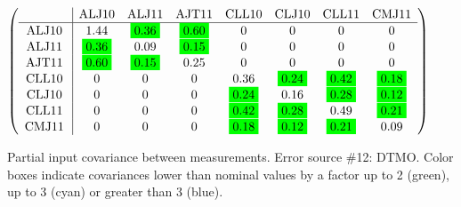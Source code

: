 \begin{table}[H]
\scriptsize
\begin{center}
\renewcommand{\arraystretch}{1.1}
\begin{math}\left(\begin{array}{c|ccccccc}
 & \mathrm{ALJ10} & 
\mathrm{ALJ11} & 
\mathrm{AJT11} & 
\mathrm{CLL10} & 
\mathrm{CLJ10} & 
\mathrm{CLL11} & 
\mathrm{CMJ11} \\
\hline
\mathrm{ALJ10} \hspace*{2pt} &       1.44 &  \colorbox{Green1}{$      0.36$} &  \colorbox{Green1}{$      0.60$} &  0 &  0 &  0 &  0 \\
\mathrm{ALJ11} \hspace*{2pt} &  \colorbox{Green1}{$      0.36$} &       0.09 &  \colorbox{Green1}{$      0.15$} &  0 &  0 &  0 &  0 \\
\mathrm{AJT11} \hspace*{2pt} &  \colorbox{Green1}{$      0.60$} &  \colorbox{Green1}{$      0.15$} &       0.25 &  0 &  0 &  0 &  0 \\
\mathrm{CLL10} \hspace*{2pt} &  0 &  0 &  0 &       0.36 &  \colorbox{Green1}{$      0.24$} &  \colorbox{Green1}{$      0.42$} &  \colorbox{Green1}{$      0.18$} \\
\mathrm{CLJ10} \hspace*{2pt} &  0 &  0 &  0 &  \colorbox{Green1}{$      0.24$} &       0.16 &  \colorbox{Green1}{$      0.28$} &  \colorbox{Green1}{$      0.12$} \\
\mathrm{CLL11} \hspace*{2pt} &  0 &  0 &  0 &  \colorbox{Green1}{$      0.42$} &  \colorbox{Green1}{$      0.28$} &       0.49 &  \colorbox{Green1}{$      0.21$} \\
\mathrm{CMJ11} \hspace*{2pt} &  0 &  0 &  0 &  \colorbox{Green1}{$      0.18$} &  \colorbox{Green1}{$      0.12$} &  \colorbox{Green1}{$      0.21$} &       0.09 \\
\end{array}\right)\end{math}
\caption{Partial input covariance between measurements. Error source \#12: DTMO. Color boxes indicate covariances lower than nominal values by a factor up to 2 (green), up to 3 (cyan) or greater than 3 (blue).}
\renewcommand{\arraystretch}{1}
\end{center}
\end{table}

